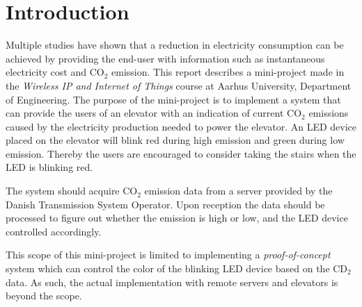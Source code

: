 \documentclass[Main]{subfiles}
\begin{document}
\section*{Introduction} %
\label{sec:introduction}
	Multiple studies have shown that a reduction in electricity consumption can be achieved by providing the end-user with information such as instantaneous electricity cost and CO$_2$ emission\cite{Tricascade:2009:Online}. 
	This report describes a mini-project made in the \emph{Wireless IP and Internet of Things} course at Aarhus University, Department of Engineering. 
	The purpose of the mini-project is to implement a system that can provide the users of an elevator with an indication of current CO$_2$ emissions caused by the electricity production needed to power the elevator. 
	An LED device placed on the elevator will blink red during high emission and green during low emission. 
	Thereby the users are encouraged to consider taking the stairs when the LED is blinking red. 

	The system should acquire CO$_2$ emission data from a server provided by the Danish Transmission System Operator. 
	Upon reception the data should be processed to figure out whether the emission is high or low, and the LED device controlled accordingly.

	This scope of this mini-project is limited to implementing a \emph{proof-of-concept} system which can control the color of the blinking LED device based on the CD$_2$ data.
	As such, the actual implementation with remote servers and elevators is beyond the scope.



\end{document}
